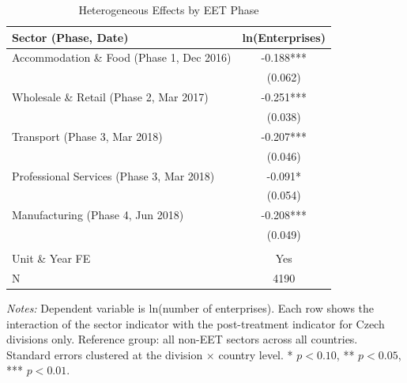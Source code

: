 \begin{table}[H]
\centering
\caption{Heterogeneous Effects by EET Phase}
\begin{threeparttable}
\begin{tabular}{lc}
\toprule
Sector (Phase, Date) & ln(Enterprises) \\
\midrule
Accommodation \& Food (Phase 1, Dec 2016) & -0.188*** \\
 & (0.062) \\
Wholesale \& Retail (Phase 2, Mar 2017) & -0.251*** \\
 & (0.038) \\
Transport (Phase 3, Mar 2018) & -0.207*** \\
 & (0.046) \\
Professional Services (Phase 3, Mar 2018) & -0.091* \\
 & (0.054) \\
Manufacturing (Phase 4, Jun 2018) & -0.208*** \\
 & (0.049) \\
 & \\
Unit \& Year FE & Yes \\
N & 4190 \\
\bottomrule
\end{tabular}
\begin{tablenotes}[flushleft]
\small
\item \textit{Notes:} Dependent variable is ln(number of enterprises). Each row shows the interaction of the sector indicator with the post-treatment indicator for Czech divisions only. Reference group: all non-EET sectors across all countries. Standard errors clustered at the division $\times$ country level. * $p<0.10$, ** $p<0.05$, *** $p<0.01$.
\end{tablenotes}
\end{threeparttable}
\label{tab:hetero}
\end{table}


